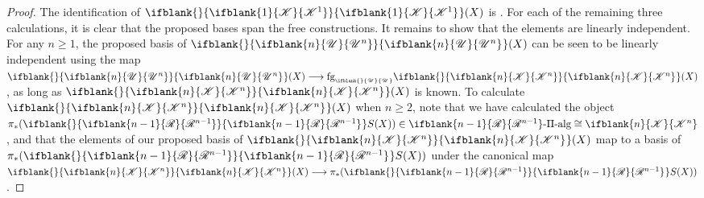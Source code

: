 \documentclass[10pt]{article}
\newcommand{\GS}[1]{\scrE^{#1}}
\newcommand{\RestLie}[1]%
{\ifblank{#1}{\mathsf{r}{\scrL}}{\mathsf{r}{\scrL}^{#1}}}
\newcommand{\GoodLie}[1]%
{\ifblank{#1}{\mathsf{g}{\scrL}}{\mathsf{g}{\scrL}^{#1}}}
\newcommand{\PRLie}[1]%
{\ifblank{#1}{\scrR}{\scrR^{#1}}}
\newcommand{\LL}[1]{\ifblank{#1}{\scrK}{\scrK^{#1}}}
\newcommand{\GR}[1]{\ifblank{#1}{\scrV}{\scrV^{#1}}}
\newcommand{\nontop}[1]{\ifblank{#1}{\scrU}{\scrU^{#1}}}
\newcommand{\PiAlg}[1]{#1\textup{-$\Pi$-alg}}
\newcommand{\admis}[1]{\mathrm{adm}(#1)}%
\newcommand{\forget}[1]{\mathrm{fg}_{\smash{\mbox{\tiny $#1$}}}}
\newcommand{\Fr}[2][]{\ifblank{#1}{#2}{#2_{#1}}}
\renewcommand{\Q}{Q}
\begin{document}
\begin{CategoriesOfInterest}
%
\begin{proof}
The identification of $\Fr{\LL{1}}(X)$ is \cite[Thm F, p.15]{MR1089001}.
For each of the remaining three calculations, it is clear that the proposed bases span the free constructions. It remains to show that the elements are linearly independent.
For any $n\geq1$, the proposed basis of $\Fr{\nontop{n}}(X)$ can be seen to be linearly independent using the map $\Fr{\nontop{n}}(X)\to \forget{\nontop{}}\Fr{\LL{n}}(X)$, as long as $\Fr{\LL{n}}(X)$ is known. To calculate $\Fr{\LL{n}}(X)$ when $n\geq2$, note that we have calculated the object $\pi_*(\Fr{\PRLie{n-1}}S(X))\in\PiAlg{\PRLie{n-1}}\cong\LL{n}$, and that the elements of our proposed basis of $\Fr{\LL{n}}(X)$ map to a basis of $\pi_*(\Fr{\PRLie{n-1}}S(X))$ under the canonical map $\Fr{\LL{n}}(X)\to \pi_*(\Fr{\PRLie{n-1}}S(X))$. %

\end{proof}
\end{CategoriesOfInterest}
\end{document}
